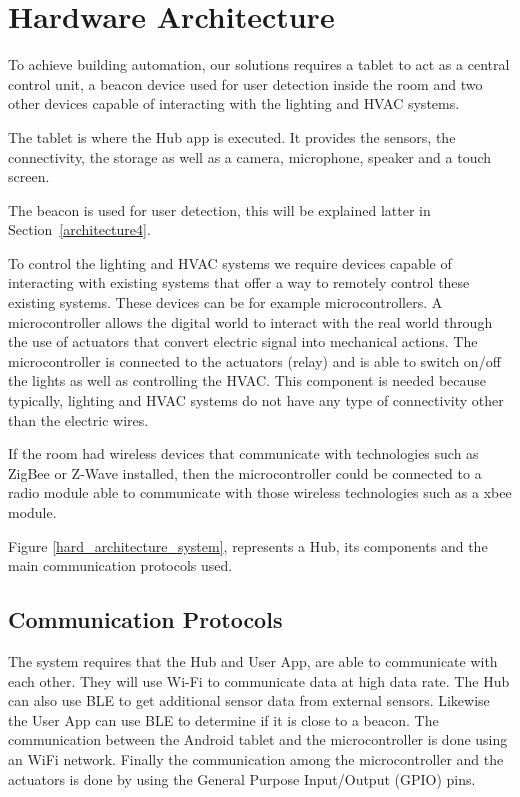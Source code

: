 \section{Hardware Architecture}\label{architecture3} 

To achieve building automation, our solutions requires a tablet to act as a central control unit, a beacon device used for user detection inside the room and two other devices capable of interacting with the lighting and \ac{HVAC} systems.

The tablet is where the Hub app is executed. It provides the sensors, the connectivity, the storage as well as a camera, microphone, speaker and a touch screen. 

The beacon is used for user detection, this will be explained latter in Section~\ref{architecture4}.

To control the lighting and \ac{HVAC} systems we require devices capable of interacting with existing systems that offer a way to remotely control these existing systems. These devices can be for example microcontrollers. A microcontroller allows the digital world to interact with the real world through the use of actuators that convert electric signal into mechanical actions. The microcontroller is connected to the actuators (relay) and is able to switch on/off the lights as well as controlling the HVAC. This component is needed because typically, lighting and HVAC systems do not have any type of connectivity other than the electric wires. 


If the room had wireless devices that communicate with technologies such as ZigBee or Z-Wave installed, then the microcontroller could be connected to a radio module able to communicate with those wireless technologies such as a xbee module.


Figure \ref{hard_architecture_system}, represents a Hub, its components and the main communication protocols used.

 

\subsection{Communication Protocols}

The system requires that the Hub and User App, are able to communicate with each other. They will use Wi-Fi to communicate data at high data rate. The Hub can also use \ac{BLE} to get additional sensor data from external sensors. Likewise the User App can use \ac{BLE} to determine if it is close to a beacon. The communication between the Android tablet and the microcontroller is done using an WiFi network. Finally the communication among the microcontroller and the actuators is done by using the General Purpose Input/Output (GPIO) pins.




